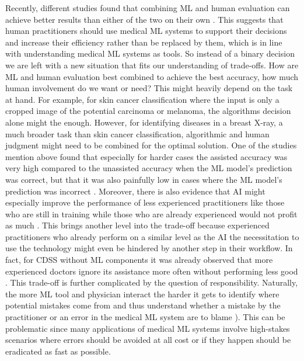 Recently, different studies found that combining ML and human evaluation can achieve better results than either of the two on their own \cite{rajpurkar2022ai, kiani2020impact, topol2019high, steiner2018impact}. This suggests that human practitioners should use medical ML systems to support their decisions and increase their efficiency rather than be replaced by them, which is in line with understanding medical ML systems as tools. So instead of a binary decision we are left with a new situation that fits our understanding of trade-offs. How are ML and human evaluation best combined to achieve the best accuracy, how much human involvement do we want or need? This might heavily depend on the task at hand. For example, for skin cancer classification where the input is only a cropped image of the potential carcinoma or melanoma, the algorithms decision alone might the enough. However, for identifying diseases in a breast X-ray, a much broader task than skin cancer classification, algorithmic and human judgment might need to be combined for the optimal solution.  One of the studies mention above found that especially for harder cases the assisted accuracy was very high compared to the unassisted accuracy when the ML model's prediction was correct, but that it was also painfully low in cases where the ML model's prediction was incorrect \cite{kiani2020impact}. Moreover, there is also evidence that AI might especially improve the performance of less experienced practitioners like those who are still in training while those who are already experienced would not profit as much \cite{rajpurkar2022ai}. This brings another level into the trade-off because experienced practitioners who already perform on a similar level as the AI the necessitation to use the technology might even be hindered by another step in their workflow. In fact, for CDSS without ML components it was already observed that more experienced doctors ignore its assistance more often without performing less good \cite{sutton2020overview}.
This trade-off is further complicated by the question of responsibility. Naturally, the more ML tool and physician interact the harder it gets to identify where potential mistakes come from and thus understand whether a mistake by the practitioner or an error in the medical ML system are to blame \cite{horgan2019artificial}). This can be problematic since many applications of medical ML systems involve high-stakes scenarios where errors should be avoided at all cost or if they happen should be eradicated as fast as possible.

